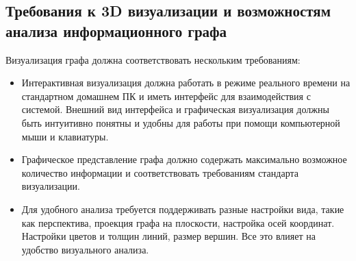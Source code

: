 \subsection{Требования к 3D визуализации и возможностям анализа информационного графа}

Визуализация графа должна соответствовать нескольким требованиям:

\begin{itemize}
    \item Интерактивная визуализация должна работать в режиме реального времени на стандартном домашнем ПК и иметь интерфейс для взаимодействия с системой. Внешний вид интерфейса и графическая визуализация должны быть интуитивно понятны и удобны для работы при помощи компьютерной мыши и клавиатуры.
    \item Графическое представление графа должно содержать максимально возможное количество информации и соответствовать требованиям стандарта визуализации.
    \item Для удобного анализа требуется поддерживать разные настройки вида, такие как перспектива, проекция графа на плоскости, настройка осей координат. Настройки цветов и толщин линий, размер вершин. Все это влияет на удобство визуального анализа.
\end{itemize}

